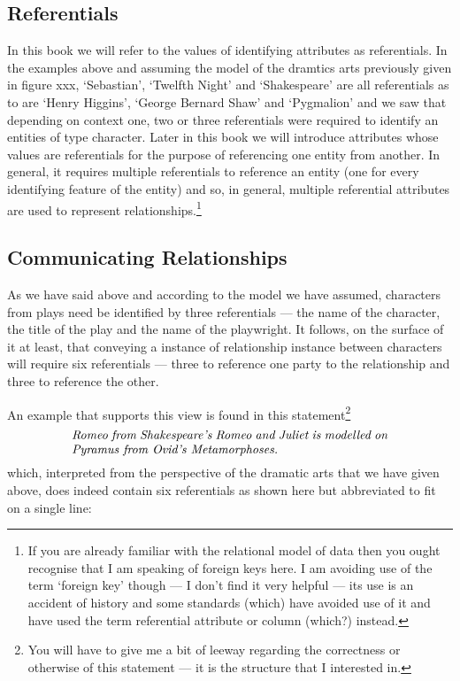 \subsection{Referentials}
\mynote
In this book we will refer to the values of identifying attributes as referentials.
In the examples above 
and assuming  the model of the dramtics arts previously given in figure xxx,
 `Sebastian', `Twelfth Night' and `Shakespeare' are all referentials 
 as to are `Henry Higgins', `George Bernard Shaw'  and `Pygmalion' and
we saw that depending on context one, two or three referentials were required
 to identify an entities of type character.
\mynote 
Later in this book we will introduce attributes whose values are referentials 
for the purpose of referencing one entity from another.
In general, it requires multiple referentials to reference an entity (one for every identifying
feature of the entity) and so, in general, multiple referential attributes are used to represent relationships.\footnote{If you are already familiar with the relational model of data then you ought recognise that I am speaking of foreign keys here. 
I am avoiding use of the term `foreign key' though --- I don't find it very helpful --- its use is an accident of history and some standards (which) have avoided use of it and have used the term referential attribute or column (which?) instead. } 

\subsection{Communicating Relationships}

\mynote As we have said above and according to the model we have assumed,
  characters from plays need be identified by three referentials
 --- the name of the character, the title of the play and the name of the playwright.
It follows, on the surface of it at least, that conveying a instance of 
relationship instance between characters will require six referentials
--- three to reference one party to the relationship and three to reference the other.

An example that supports this view is found in this statement\footnote{You will have to give me a bit of leeway regarding the correctness or otherwise of this statement --- it is the structure that I interested in.}
\begin{equation}
\text{\parbox{9cm}{\textit{Romeo from Shakespeare's Romeo and Juliet
                           is modelled on Pyramus from Ovid's Metamorphoses.}}}
\end{equation}
which, interpreted from the perspective of the dramatic arts that we have given above, does indeed contain six referentials as shown here but abbreviated to fit on a single line:

